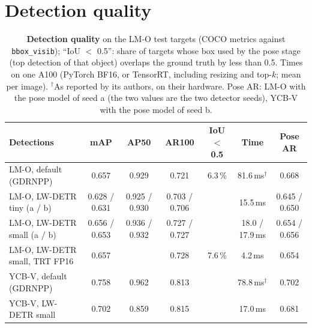 \section{Detection quality}
\label{sec:supp:det}

\begin{table}[h]
  \centering
  \setlength{\tabcolsep}{2.5pt}
  \footnotesize
  \begin{tabular}{lcccccc}
    \toprule
    Detections & mAP & AP50 & AR100 & IoU $<$ 0.5 & Time & Pose AR \\
    \midrule
    LM-O, default (GDRNPP) & 0.657 & 0.929 & 0.721 & 6.3\,\% & 81.6\,ms$^\dagger$ & 0.668 \\
    LM-O, LW-DETR tiny (a / b) & 0.628 / 0.631 & 0.925 / 0.930 & 0.703 / 0.706 & & 15.5\,ms & 0.645 / 0.650 \\
    LM-O, LW-DETR small (a / b) & 0.656 / 0.653 & 0.936 / 0.932 & 0.727 / 0.727 & & 18.0 / 17.9\,ms & 0.654 / 0.656 \\
    LM-O, LW-DETR small, TRT FP16 & 0.657 & & 0.728 & 7.6\,\% & 4.2\,ms & 0.654 \\
    \midrule
    YCB-V, default (GDRNPP) & 0.758 & 0.962 & 0.813 & & 78.8\,ms$^\dagger$ & 0.702 \\
    YCB-V, LW-DETR small & 0.702 & 0.859 & 0.815 & & 17.0\,ms & 0.681 \\
    \bottomrule
  \end{tabular}
  \caption{\textbf{Detection quality} on the LM-O test targets (COCO metrics against
  \texttt{bbox\_visib}); ``IoU $<$ 0.5'': share of targets whose box used by the pose stage (top
  detection of that object) overlaps the ground truth by less than 0.5. Times on one A100 (PyTorch
  BF16, or TensorRT, including resizing and top-$k$; mean per image). $^\dagger$As reported by its
  authors, on their hardware. Pose AR: LM-O with the pose model of seed a (the two values are the two
  detector seeds), YCB-V with the pose model of seed b.}
  \label{tab:supp:det}
\end{table}

